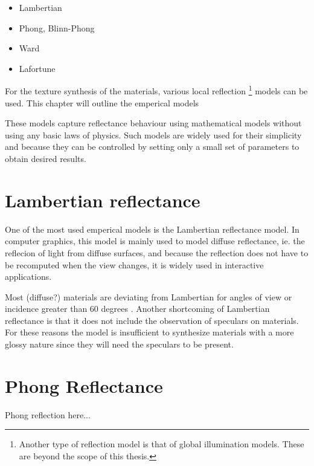 \hypertarget{empericalModels}{
}
\begin{itemize}
	\item{Lambertian}
	\item{Phong, Blinn-Phong}
	\item{Ward}
	\item{Lafortune}
\end{itemize}

\noindent For the texture synthesis of the materials, various local reflection \footnote[1]{Another type of reflection model is that of global illumination models. These are beyond the scope of this thesis.} models can be used. This chapter will outline the emperical models

These models capture reflectance behaviour using mathematical models without using any basic laws of physics. Such models are widely used for their simplicity and because they can be controlled by setting only a small set of parameters to obtain desired results.

	\section{Lambertian reflectance}\label{Lambertian}
		One of the most used emperical models is the Lambertian reflectance model. In computer graphics, this model is mainly used to model diffuse reflectance, ie. the reflecion of light from diffuse surfaces, and because the reflection does not have to be recomputed when the view changes, it is widely used in interactive applications. 

Most \todo(diffuse?) materials are deviating from Lambertian for angles of view or incidence greater than 60 degrees \cite{DigitalModeling}. Another shortcoming of Lambertian reflectance is that it does not include the observation of speculars on materials. For these reasons the model is insufficient to synthesize materials with a more glossy nature since they will need the speculars to be present. 





	\section{Phong Reflectance}\label{Phong}
		Phong reflection here...

